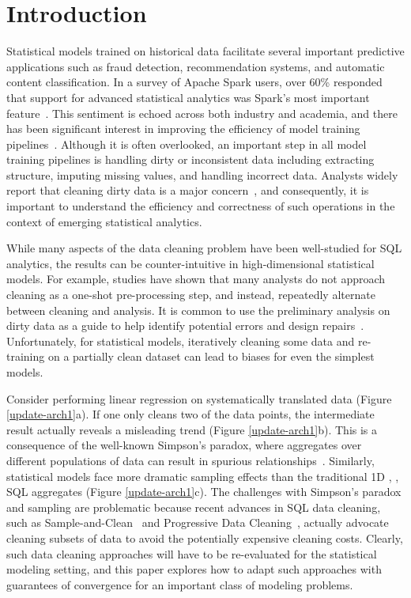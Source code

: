 \section{Introduction}
Statistical models trained on historical data facilitate several important predictive applications such as fraud detection, recommendation systems, and automatic content classification.
In a survey of Apache Spark users, over 60\% responded that support for advanced statistical analytics was Spark's most important feature~\cite{sparksurvey}.
This sentiment is echoed across both industry and academia, and there has been significant interest in improving the efficiency of model training pipelines~\cite{bdas, alexandrov2014stratosphere, crotty2014tupleware, tensor}. 
Although it is often overlooked, an important step in all model training pipelines is handling dirty or inconsistent data including extracting structure, imputing missing values, and handling incorrect data.
Analysts widely report that cleaning dirty data is a major concern~\cite{kandel2012,nytimes}, and consequently, it is important to understand the efficiency and correctness of such operations in the context of emerging statistical analytics.

While many aspects of the data cleaning problem have been well-studied for SQL analytics, the results can be counter-intuitive in high-dimensional statistical models.
For example, studies have shown that many analysts do not approach cleaning as a one-shot pre-processing step, and instead, repeatedly alternate between cleaning and analysis.
It is common to use the preliminary analysis on dirty data as a guide to help identify potential errors and design repairs~\cite{kandel2012}.
Unfortunately, for statistical models, iteratively cleaning some data and re-training on a partially clean dataset can lead to biases for even the simplest models.

Consider performing linear regression on systematically translated data (Figure \ref{update-arch1}a).
If one only cleans two of the data points, the intermediate result actually reveals a misleading trend (Figure \ref{update-arch1}b).
This is a consequence of the well-known Simpson's paradox, where aggregates over different populations of data can result in spurious relationships~\cite{simpson1951interpretation}. 
Similarly, statistical models face more dramatic sampling effects than the traditional 1D  \sumfunc, \countfunc, \avgfunc SQL aggregates (Figure \ref{update-arch1}c).
The challenges with Simpson's paradox and sampling are problematic because recent advances in SQL data cleaning, such as Sample-and-Clean~\cite{wang1999sample} and Progressive Data Cleaning~\cite{altowim2014progressive, papenbrock2015progressive, DBLP:journals/pvldb/YakoutENOI11}, actually advocate cleaning subsets of data to avoid the potentially expensive cleaning costs.
Clearly, such data cleaning approaches will have to be re-evaluated for the statistical modeling setting, and this paper explores how to adapt such approaches with guarantees of convergence for an important class of modeling problems. 

